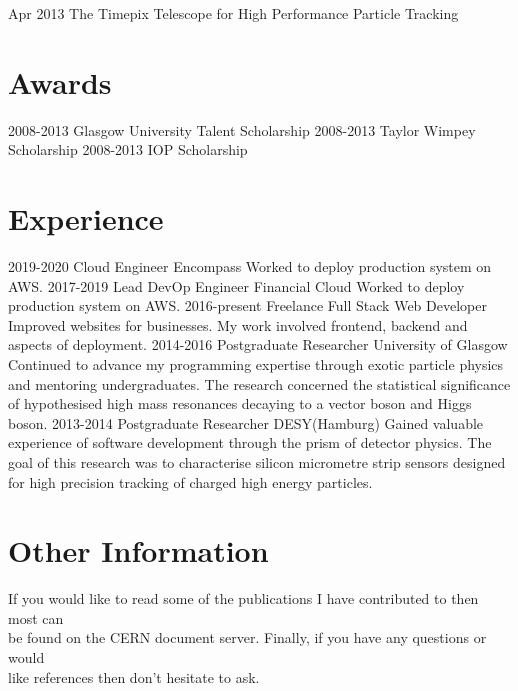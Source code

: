 \documentclass[]{twentysecondcv}
\begin{document}
\begin{twentyshort}
  \twentyitemshort
    {Apr 2013}
    {The Timepix Telescope for High Performance Particle Tracking}
\end{twentyshort}



\section*{Awards}

\begin{twentyshort}
  \twentyitemshort
    {2008-2013}
    {Glasgow University Talent Scholarship}
  \twentyitemshort
    {2008-2013}
    {Taylor Wimpey Scholarship}
  \twentyitemshort
    {2008-2013}
    {IOP Scholarship}
\end{twentyshort}


\section*{Experience}

\begin{twenty}
  \twentyitem
  {2019-2020}
  {Cloud Engineer}
  {Encompass}
  {Worked to deploy production system on AWS.}
  \twentyitem
  {2017-2019}
  {Lead DevOp Engineer}
  {Financial Cloud}
  {Worked to deploy production system on AWS.}
  \twentyitem
    {2016-present}
    {Freelance Full Stack Web Developer}
    {}
    {Improved websites for businesses. My work involved frontend, backend and aspects of deployment.}
  \twentyitem
    {2014-2016}
    {Postgraduate Researcher}
    {University of Glasgow}
    {Continued to advance my programming expertise through exotic particle physics and mentoring undergraduates.  The research concerned the  statistical significance of hypothesised high mass resonances decaying to a vector boson and Higgs boson.}
\twentyitem
    {2013-2014}
    {Postgraduate Researcher}
		{DESY(Hamburg)}
    {Gained valuable experience of software development through the prism of detector physics.  The goal of this research was to  characterise silicon micrometre strip sensors designed for high precision tracking of charged high energy particles.}

\end{twenty}
\section*{Other Information}
\hspace*{5pt}
If you would like to read some of the publications I have contributed to then most can \\ \hspace*{5pt} be found on the CERN document server. Finally, if you have any questions or would \\ \hspace*{5pt} like references then don't hesitate to ask. \\ 
\hspace*{5pt}
\vspace*{2pt}

\end{document}
